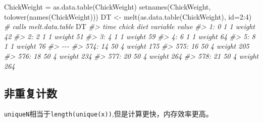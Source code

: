 \documentclass[
]{book}
\newenvironment{Shaded}{\begin{snugshade}}{\end{snugshade}}
\newcommand{\AttributeTok}[1]{\textcolor[rgb]{0.77,0.63,0.00}{#1}}
\newcommand{\CommentTok}[1]{\textcolor[rgb]{0.56,0.35,0.01}{\textit{#1}}}
\newcommand{\DecValTok}[1]{\textcolor[rgb]{0.00,0.00,0.81}{#1}}
\newcommand{\FunctionTok}[1]{\textcolor[rgb]{0.00,0.00,0.00}{#1}}
\newcommand{\NormalTok}[1]{#1}
\newcommand{\OtherTok}[1]{\textcolor[rgb]{0.56,0.35,0.01}{#1}}
\newcommand{\SpecialCharTok}[1]{\textcolor[rgb]{0.00,0.00,0.00}{#1}}
\begin{document}
\begin{Shaded}
\begin{Highlighting}[]
\NormalTok{ChickWeight }\OtherTok{=} \FunctionTok{as.data.table}\NormalTok{(ChickWeight)}
\FunctionTok{setnames}\NormalTok{(ChickWeight, }\FunctionTok{tolower}\NormalTok{(}\FunctionTok{names}\NormalTok{(ChickWeight)))}
\NormalTok{DT }\OtherTok{\textless{}{-}} \FunctionTok{melt}\NormalTok{(}\FunctionTok{as.data.table}\NormalTok{(ChickWeight), }\AttributeTok{id=}\DecValTok{2}\SpecialCharTok{:}\DecValTok{4}\NormalTok{) }\CommentTok{\# calls melt.data.table}
\NormalTok{DT}
\CommentTok{\#\textgreater{}      time chick diet variable value}
\CommentTok{\#\textgreater{}   1:    0     1    1   weight    42}
\CommentTok{\#\textgreater{}   2:    2     1    1   weight    51}
\CommentTok{\#\textgreater{}   3:    4     1    1   weight    59}
\CommentTok{\#\textgreater{}   4:    6     1    1   weight    64}
\CommentTok{\#\textgreater{}   5:    8     1    1   weight    76}
\CommentTok{\#\textgreater{}  {-}{-}{-}                               }
\CommentTok{\#\textgreater{} 574:   14    50    4   weight   175}
\CommentTok{\#\textgreater{} 575:   16    50    4   weight   205}
\CommentTok{\#\textgreater{} 576:   18    50    4   weight   234}
\CommentTok{\#\textgreater{} 577:   20    50    4   weight   264}
\CommentTok{\#\textgreater{} 578:   21    50    4   weight   264}
\end{Highlighting}
\end{Shaded}

\hypertarget{ux975eux91cdux590dux8ba1ux6570}{%
\subsection{非重复计数}\label{ux975eux91cdux590dux8ba1ux6570}}

\texttt{uniqueN}相当于\texttt{length(unique(x))},但是计算更快，内存效率更高。
\end{document}
